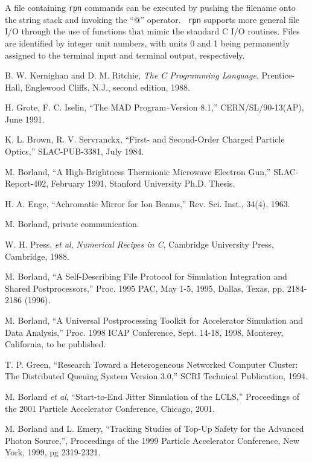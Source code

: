 \documentclass[11pt]{article}
\begin{document}
A file containing {\tt rpn} commands can be executed by pushing the
filename onto the string stack and invoking the ``@'' operator.  {\tt
rpn} supports more general file I/O through the use of functions that
mimic the standard C I/O routines.  Files are identified by integer
unit numbers, with units 0 and 1 being permanently assigned to the
terminal input and terminal output, respectively.

\newpage
\begin{thebibliography}{9}

    B. W. Kernighan and D. M. Ritchie, {\em The C Programming Language},
    Prentice-Hall, Englewood Cliffs, N.J., second edition, 1988.

    H. Grote, F. C. Iselin, ``The MAD Program--Version 8.1,'' CERN/SL/90-13(AP), June 1991.

    K. L. Brown, R. V. Servranckx, ``First- and Second-Order Charged Particle Optics,'' 
    SLAC-PUB-3381, July 1984.

    M. Borland, ``A High-Brightness Thermionic Microwave Electron Gun,'' SLAC-Report-402,
    February 1991, Stanford University Ph.D. Thesis.

    H. A. Enge, ``Achromatic Mirror for Ion Beams,'' Rev. Sci. Inst., 34(4), 1963.

    M. Borland, private communication.

    W. H. Press, {\em et al}, {\em Numerical Recipes in C}, Cambridge University
    Press, Cambridge, 1988.

M. Borland, ``A Self-Describing File Protocol for Simulation
Integration and Shared Postprocessors,'' Proc. 1995 PAC, May 1-5,
1995, Dallas, Texas, pp. 2184-2186 (1996).

M. Borland, ``A Universal Postprocessing Toolkit for Accelerator 
Simulation and Data Analysis,'' Proc. 1998 ICAP Conference, 
Sept. 14-18, 1998, Monterey, California, to be published.

 T. P. Green, ``Research Toward a Heterogeneous Networked
Computer Cluster: The Distributed Queuing System Version 3.0,'' SCRI
Technical Publication, 1994.

 M. Borland {\em et al}, ``Start-to-End Jitter Simulation
of the LCLS,'' Proceedings of the 2001 Particle Accelerator Conference,
Chicago, 2001.

 M. Borland and L. Emery, ``Tracking Studies of
Top-Up Safety for the Advanced Photon Source,'', Proceedings of the
1999 Particle Accelerator Conference, New York, 1999, pg 2319-2321.


\end{thebibliography}
\end{document}
